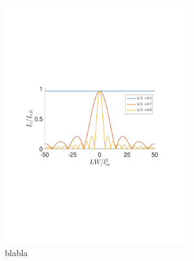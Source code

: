 \begin{figure}[hhh]
\centering
\includegraphics[width=8cm,clip=true,trim=2cm 8cm 3cm 9cm]{fig/Critical5}
\caption{blabla}
\label{fig:Critical5}
\end{figure}


